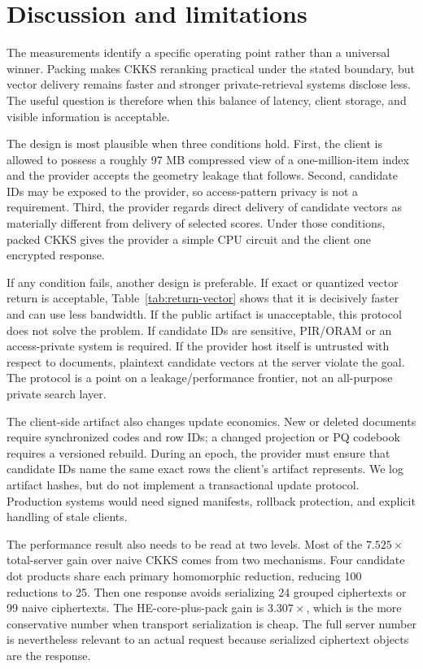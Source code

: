 \documentclass[pdflatex,sn-basic,Numbered]{sn-jnl}
\theoremstyle{plain}
\begin{document}
\section{Discussion and limitations}\label{sec:discussion}

The measurements identify a specific operating point rather than a universal winner. Packing makes CKKS reranking practical under the stated boundary, but vector delivery remains faster and stronger private-retrieval systems disclose less. The useful question is therefore when this balance of latency, client storage, and visible information is acceptable.

The design is most plausible when three conditions hold. First, the client is allowed to possess a roughly 97 MB compressed view of a one-million-item index and the provider accepts the geometry leakage that follows. Second, candidate IDs may be exposed to the provider, so access-pattern privacy is not a requirement. Third, the provider regards direct delivery of candidate vectors as materially different from delivery of selected scores. Under those conditions, packed CKKS gives the provider a simple CPU circuit and the client one encrypted response.

If any condition fails, another design is preferable. If exact or quantized vector return is acceptable, Table~\ref{tab:return-vector} shows that it is decisively faster and can use less bandwidth. If the public artifact is unacceptable, this protocol does not solve the problem. If candidate IDs are sensitive, PIR/ORAM or an access-private system is required. If the provider host itself is untrusted with respect to documents, plaintext candidate vectors at the server violate the goal. The protocol is a point on a leakage/performance frontier, not an all-purpose private search layer.

The client-side artifact also changes update economics. New or deleted documents require synchronized codes and row IDs; a changed projection or PQ codebook requires a versioned rebuild. During an epoch, the provider must ensure that candidate IDs name the same exact rows the client's artifact represents. We log artifact hashes, but do not implement a transactional update protocol. Production systems would need signed manifests, rollback protection, and explicit handling of stale clients.

The performance result also needs to be read at two levels. Most of the $7.525\times$ total-server gain over naive CKKS comes from two mechanisms. Four candidate dot products share each primary homomorphic reduction, reducing 100 reductions to 25. Then one response avoids serializing 24 grouped ciphertexts or 99 naive ciphertexts. The HE-core-plus-pack gain is $3.307\times$, which is the more conservative number when transport serialization is cheap. The full server number is nevertheless relevant to an actual request because serialized ciphertext objects are the response.
\end{document}
